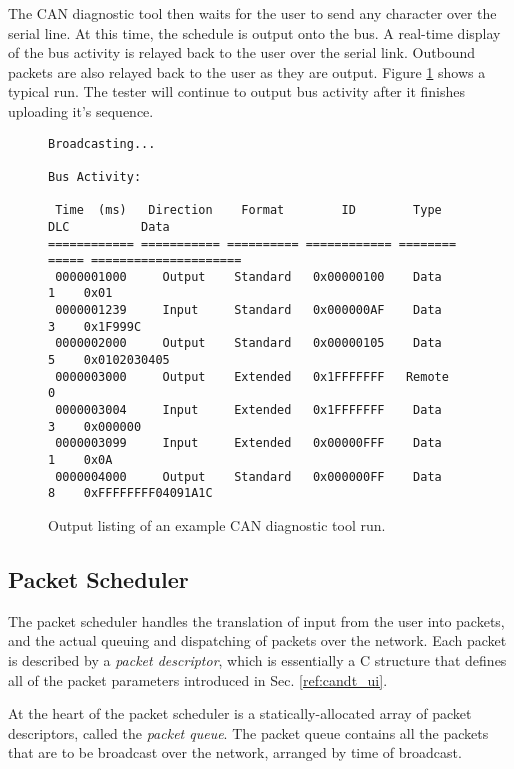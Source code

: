 The CAN diagnostic tool then waits for the user to send any character over the serial line. At this time, the schedule is output onto the bus. A real-time display of the bus activity is relayed back to the user over the serial link. Outbound packets are also relayed back to the user as they are output. Figure \ref{fig:candt_output} shows a typical run. The tester will continue to output bus activity after it finishes uploading it's sequence. 

\begin{figure}[H]
	\centering
	\makebox[\textwidth]{\hrulefill}
{\footnotesize	
	\begin{verbatim}
Broadcasting...

Bus Activity:

 Time  (ms)   Direction    Format        ID        Type    DLC          Data                  
============ =========== ========== ============ ======== ===== =====================
 0000001000     Output    Standard   0x00000100    Data     1    0x01 
 0000001239     Input     Standard   0x000000AF    Data     3    0x1F999C  
 0000002000     Output    Standard   0x00000105    Data     5    0x0102030405
 0000003000     Output    Extended   0x1FFFFFFF   Remote    0    
 0000003004     Input     Extended   0x1FFFFFFF    Data     3    0x000000
 0000003099     Input     Extended   0x00000FFF    Data     1    0x0A 
 0000004000     Output    Standard   0x000000FF    Data     8    0xFFFFFFFF04091A1C    
	\end{verbatim}
}	
	\makebox[\textwidth]{\hrulefill}
	\caption{Output listing of an example CAN diagnostic tool run.}
	\label{fig:candt_output}
\end{figure}
 
\subsection{Packet Scheduler}

The packet scheduler handles the translation of input from the user into packets, and the actual queuing and dispatching of packets over the network. Each packet is described by a \emph{packet descriptor}, which is essentially a C structure that defines all of the packet parameters introduced in Sec. \ref{ref:candt_ui}. 

At the heart of the packet scheduler is a statically-allocated array of packet descriptors, called the \emph{packet queue}. The packet queue contains all the packets that are to be broadcast over the network, arranged by time of broadcast.

